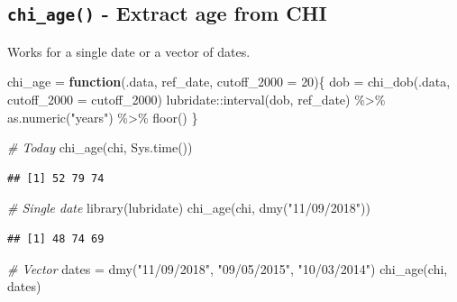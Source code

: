 \documentclass[
]{book}
\newenvironment{Shaded}{\begin{snugshade}}{\end{snugshade}}
\newcommand{\AttributeTok}[1]{\textcolor[rgb]{0.77,0.63,0.00}{#1}}
\newcommand{\CommentTok}[1]{\textcolor[rgb]{0.56,0.35,0.01}{\textit{#1}}}
\newcommand{\ControlFlowTok}[1]{\textcolor[rgb]{0.13,0.29,0.53}{\textbf{#1}}}
\newcommand{\DecValTok}[1]{\textcolor[rgb]{0.00,0.00,0.81}{#1}}
\newcommand{\FunctionTok}[1]{\textcolor[rgb]{0.00,0.00,0.00}{#1}}
\newcommand{\NormalTok}[1]{#1}
\newcommand{\OtherTok}[1]{\textcolor[rgb]{0.56,0.35,0.01}{#1}}
\newcommand{\SpecialCharTok}[1]{\textcolor[rgb]{0.00,0.00,0.00}{#1}}
\newcommand{\StringTok}[1]{\textcolor[rgb]{0.31,0.60,0.02}{#1}}
\begin{document}
\hypertarget{chi_age---extract-age-from-chi}{%
\subsection{\texorpdfstring{\texttt{chi\_age()} - Extract age from CHI}{chi\_age() - Extract age from CHI}}\label{chi_age---extract-age-from-chi}}

Works for a single date or a vector of dates.

\begin{Shaded}
\begin{Highlighting}[]
\NormalTok{chi\_age }\OtherTok{=} \ControlFlowTok{function}\NormalTok{(.data, ref\_date, }\AttributeTok{cutoff\_2000 =} \DecValTok{20}\NormalTok{)\{}
\NormalTok{  dob }\OtherTok{=} \FunctionTok{chi\_dob}\NormalTok{(.data, }\AttributeTok{cutoff\_2000 =}\NormalTok{ cutoff\_2000)}
\NormalTok{  lubridate}\SpecialCharTok{::}\FunctionTok{interval}\NormalTok{(dob, ref\_date) }\SpecialCharTok{\%\textgreater{}\%} 
    \FunctionTok{as.numeric}\NormalTok{(}\StringTok{"years"}\NormalTok{) }\SpecialCharTok{\%\textgreater{}\%} 
    \FunctionTok{floor}\NormalTok{()}
\NormalTok{\}}

\CommentTok{\# Today}
\FunctionTok{chi\_age}\NormalTok{(chi, }\FunctionTok{Sys.time}\NormalTok{())}
\end{Highlighting}
\end{Shaded}

\begin{verbatim}
## [1] 52 79 74
\end{verbatim}

\begin{Shaded}
\begin{Highlighting}[]
\CommentTok{\# Single date}
\FunctionTok{library}\NormalTok{(lubridate)}
\FunctionTok{chi\_age}\NormalTok{(chi, }\FunctionTok{dmy}\NormalTok{(}\StringTok{"11/09/2018"}\NormalTok{))}
\end{Highlighting}
\end{Shaded}

\begin{verbatim}
## [1] 48 74 69
\end{verbatim}

\begin{Shaded}
\begin{Highlighting}[]
\CommentTok{\# Vector}
\NormalTok{dates }\OtherTok{=} \FunctionTok{dmy}\NormalTok{(}\StringTok{"11/09/2018"}\NormalTok{,}
            \StringTok{"09/05/2015"}\NormalTok{,}
            \StringTok{"10/03/2014"}\NormalTok{)}
\FunctionTok{chi\_age}\NormalTok{(chi, dates)}
\end{Highlighting}
\end{Shaded}
\end{document}
